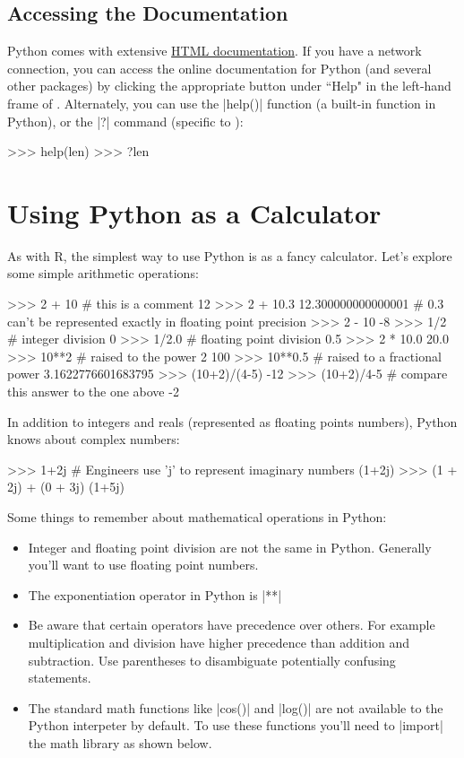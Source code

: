 \subsection{Accessing the Documentation}

Python comes with extensive \href{http://docs.python.org/}{HTML documentation}. If you have a network connection, you can access the online documentation for Python (and several other packages) by clicking the appropriate button under ``Help" in the left-hand frame of \ipy. Alternately, you can use the |help()| function (a built-in function in Python), or the |?| command (specific to \ipython):
%
\begin{python}
>>> help(len)
>>> ?len
\end{python}



\section{Using Python as a Calculator}

As with R, the simplest way to use Python is as a fancy calculator.
Let's explore some simple arithmetic operations:
%
\begin{python}
>>> 2 + 10   # this is a comment
12
>>> 2 + 10.3
 12.300000000000001  # 0.3 can't be represented exactly in floating point precision
>>> 2 - 10
-8
>>> 1/2  # integer division
0
>>> 1/2.0  # floating point division
0.5
>>> 2 * 10.0
20.0
>>> 10**2  # raised to the power 2
100
>>> 10**0.5  # raised to a fractional power
3.1622776601683795
>>> (10+2)/(4-5)
-12
>>> (10+2)/4-5  # compare this answer to the one above 
-2
\end{python}
%
In addition to integers and reals (represented as floating points
numbers), Python knows about complex numbers:
%
\begin{python}
>>> 1+2j  # Engineers use 'j' to represent imaginary numbers
(1+2j)
>>> (1 + 2j) + (0 + 3j)
(1+5j)
\end{python}

Some things to remember about mathematical operations in Python:
\begin{itemize}
\item
  Integer and floating point division are not the same in Python.
  Generally you'll want to use floating point numbers.
\item
  The exponentiation operator in Python is |**|
\item
  Be aware that certain operators have precedence over others. For
  example multiplication and division have higher precedence than
  addition and subtraction. Use parentheses to disambiguate potentially
  confusing statements.
\item
  The standard math functions like |cos()| and
  |log()| are not available to the Python interpeter by
  default. To use these functions you'll need to |import| the
  math library as shown below.
\end{itemize}

